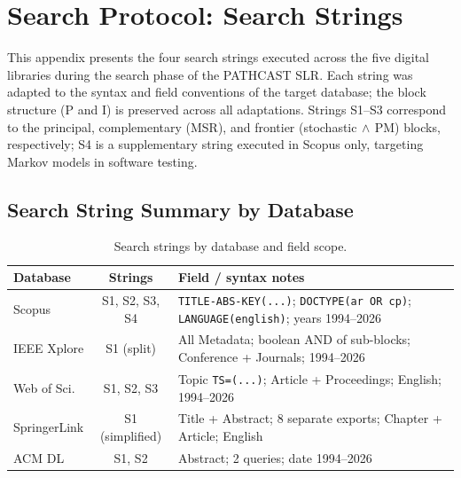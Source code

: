 %


\chapter{Search Protocol: Search Strings}
\label{app:E}

This appendix presents the four search strings executed across the five
digital libraries during the search phase of the PATHCAST SLR. Each string
was adapted to the syntax and field conventions of the target database; the
block structure (P and I) is preserved across all adaptations. Strings
S1--S3 correspond to the principal, complementary (MSR), and frontier
(stochastic$\,\wedge\,$PM) blocks, respectively; S4 is a supplementary
string executed in Scopus only, targeting Markov models in software testing.

\section{Search String Summary by Database}
\label{app:slr-strings}

\begin{table}[htbp]
\centering
\caption{Search strings by database and field scope.}
\label{tab:app-strings}
\small
\setlength{\tabcolsep}{4pt}
\begin{tabular}{p{2.0cm} c p{9.5cm}}
\toprule
\textbf{Database} & \textbf{Strings} & \textbf{Field / syntax notes} \\
\midrule
Scopus       & S1, S2, S3, S4 & \texttt{TITLE-ABS-KEY(...)};
                                  \texttt{DOCTYPE(ar OR cp)};
                                  \texttt{LANGUAGE(english)};
                                  years 1994--2026 \\
IEEE Xplore  & S1 (split)     & All Metadata; boolean AND of sub-blocks;
                                  Conference + Journals; 1994--2026 \\
Web of Sci.  & S1, S2, S3     & Topic \texttt{TS=(...)}; Article + Proceedings;
                                  English; 1994--2026 \\
SpringerLink & S1 (simplified)& Title + Abstract; 8 separate exports;
                                  Chapter + Article; English \\
ACM DL       & S1, S2         & Abstract; 2 queries; date 1994--2026 \\
\bottomrule
\end{tabular}
\end{table}

